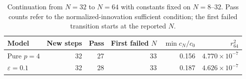 \begin{table}[!htbp]
\centering\small
\caption{Continuation from $N=32$ to $N=64$ with constants fixed on $N=8$--$32$. Pass counts refer to the normalized-innovation sufficient condition; the first failed transition starts at the reported $N$.}
\label{tab:continuation-window}
\begin{tabular}{@{}lrrrrr@{}}
\toprule
Model & New steps & Pass & First failed $N$ & $\min c_N/c_0$ & $r_{64}^2$ \\
\midrule
Pure $p=4$ & 32 & 27 & 33 & 0.156 & $4.770\times10^{-7}$ \\
$\varepsilon=0.1$ & 32 & 28 & 33 & 0.187 & $4.626\times10^{-7}$ \\
\bottomrule
\end{tabular}
\end{table}
